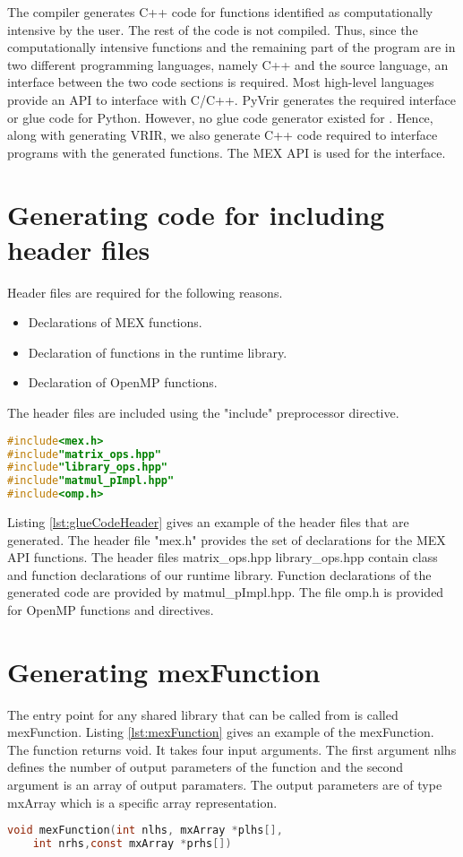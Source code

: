 The \velocty compiler generates C++ code for functions identified as computationally intensive by the user. The rest of the code is not compiled. Thus, since the computationally intensive functions and the remaining part of the program are in two different programming languages, namely C++ and the source language, an interface between the two code sections is required. Most high-level languages provide an API to interface with C/C++. PyVrir generates the required interface or glue code for Python. However, no glue code generator existed for \matlab.  Hence, along with generating VRIR, we also generate C++ code required to interface \matlab programs with the generated functions. The \matlab MEX API is used for the interface. 
\section{Generating code for including header files}
Header files are required for the following reasons.
\begin{itemize}
\item Declarations of MEX functions. 
\item Declaration of functions in the runtime library. 
\item Declaration of OpenMP functions.
\end{itemize}
The header files are included using the "include" preprocessor directive. 
\begin{lstlisting}[float,language=c,caption={Example of header files in glue code},label={lst:glueCodeHeader}]
#include<mex.h>
#include"matrix_ops.hpp"
#include"library_ops.hpp"
#include"matmul_pImpl.hpp"
#include<omp.h>
\end{lstlisting}
Listing \ref{lst:glueCodeHeader} gives an example of the header files that are generated. The header file "mex.h" provides the set of declarations for the MEX API functions. The header files matrix\_ops.hpp library\_ops.hpp contain class and function declarations of our runtime library. Function declarations of the generated code are provided by matmul\_pImpl.hpp. The file omp.h is provided for OpenMP functions and directives. 
\section{Generating mexFunction}
The entry point for any shared library that can be called from \matlab is called mexFunction. Listing \ref{lst:mexFunction} gives an example of the mexFunction. The function returns void. It takes four input arguments. The first argument nlhs defines the number of output parameters of the function and the second argument is an array of output paramaters. The output parameters are of type mxArray which is a \matlab specific array representation. 
\begin{lstlisting}[float,language=c,caption={The entry point function for the MEX API},label={lst:mexFunction}]
void mexFunction(int nlhs, mxArray *plhs[],
    int nrhs,const mxArray *prhs[])
\end{lstlisting}
